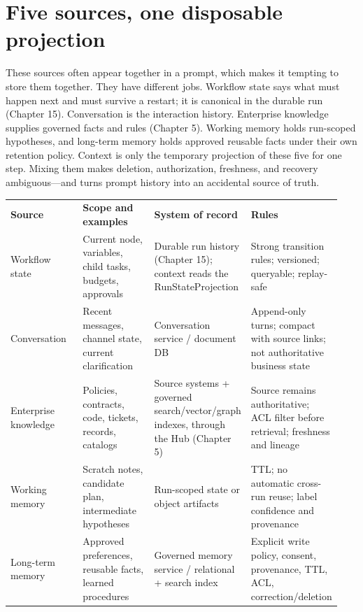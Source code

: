\section{Five sources, one disposable projection}

These sources often appear together in a prompt, which makes it tempting to store them together. They have different jobs. Workflow state says what must happen next and must survive a restart; it is canonical in the durable run (Chapter 15). Conversation is the interaction history. Enterprise knowledge supplies governed facts and rules (Chapter 5). Working memory holds run-scoped hypotheses, and long-term memory holds approved reusable facts under their own retention policy. Context is only the temporary projection of these five for one step. Mixing them makes deletion, authorization, freshness, and recovery ambiguous—and turns prompt history into an accidental source of truth.\par

\BookTableStart
\fontsize{7.2}{9}\selectfont
\begin{tabular}{@{}Y{0.2350\linewidth}Y{0.2350\linewidth}Y{0.2350\linewidth}Y{0.2350\linewidth}@{}}
\color{white}\bfseries \textbf{Source} & \color{white}\bfseries \textbf{Scope and examples} & \color{white}\bfseries \textbf{System of record} & \color{white}\bfseries \textbf{Rules} \\
Workflow state & Current node, variables, child tasks, budgets, approvals & Durable run history (Chapter 15); context reads the RunStateProjection & Strong transition rules; versioned; queryable; replay-safe \\
Conversation & Recent messages, channel state, current clarification & Conversation service / document DB & Append-only turns; compact with source links; not authoritative business state \\
Enterprise knowledge & Policies, contracts, code, tickets, records, catalogs & Source systems + governed search/vector/graph indexes, through the Hub (Chapter 5) & Source remains authoritative; ACL filter before retrieval; freshness and lineage \\
Working memory & Scratch notes, candidate plan, intermediate hypotheses & Run-scoped state or object artifacts & TTL; no automatic cross-run reuse; label confidence and provenance \\
Long-term memory & Approved preferences, reusable facts, learned procedures & Governed memory service / relational + search index & Explicit write policy, consent, provenance, TTL, ACL, correction/deletion \\
\end{tabular}
\BookTableEnd

